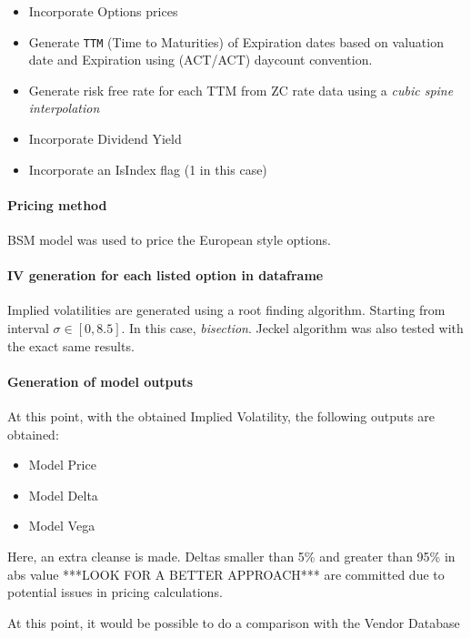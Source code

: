 \documentclass[11pt,confidential]{article}
\begin{document}
\begin{itemize}

\item Incorporate Options prices 
\item Generate \verb"TTM" (Time to Maturities) of Expiration dates based on valuation date and Expiration using (ACT/ACT) daycount convention.
\item Generate risk free rate for each TTM from ZC rate data using a \textit{cubic spine interpolation}
\item Incorporate Dividend Yield
\item Incorporate an IsIndex flag (1 in this case)
\end{itemize}



\paragraph{Pricing method}

BSM model was used to price the European style options. 

\paragraph{IV generation for each listed option in dataframe}

Implied volatilities are generated using a root finding algorithm. Starting from interval $\sigma\in [0,8.5]$. In this case, \textit{bisection}. Jeckel algorithm was also tested with the exact same results. 

\paragraph{Generation of model outputs}

At this point, with the obtained Implied Volatility, the following outputs are obtained:

\begin{itemize}
\item  Model Price
\item  Model Delta
\item  Model Vega
\end{itemize}

Here, an extra cleanse is made. Deltas smaller than 5\% and greater than 95\% in abs value ***LOOK FOR A BETTER APPROACH*** are committed due to potential issues in pricing calculations.


At this point, it would be possible to do a comparison with the Vendor Database
\end{document}
